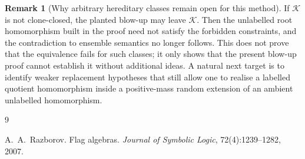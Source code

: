 \documentclass[11pt]{article}
\theoremstyle{definition}
\newtheorem{remark}[theorem]{Remark}
\newcommand{\K}{\mathcal{K}}
\begin{document}
\begin{remark}[Why arbitrary hereditary classes remain open for this method]
If $\K$ is not clone-closed, the planted blow-up may leave $\K$.  Then the
unlabelled root homomorphism built in the proof need not satisfy the forbidden
constraints, and the contradiction to ensemble semantics no longer follows.
This does not prove that the equivalence fails for such classes; it only shows
that the present blow-up proof cannot establish it without additional ideas.
A natural next target is to identify weaker replacement hypotheses that still
allow one to realise a labelled quotient homomorphism inside a positive-mass
random extension of an ambient unlabelled homomorphism.
\end{remark}

\begin{thebibliography}{9}

A.~A.~Razborov.
\newblock Flag algebras.
\newblock \emph{Journal of Symbolic Logic}, 72(4):1239--1282, 2007.


\end{thebibliography}
\end{document}
